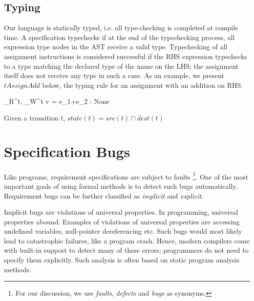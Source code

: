 \documentclass[12pt,a4paper]{article}
\begin{document}
\subsection{Typing}
Our language is statically typed, i.e. all type-checking is completed at compile time. A specification typechecks if at the end of the typechecking process, all expression type nodes in the AST receive a valid type. Typechecking of all assignment instructions is considered successful if the RHS expression typechecks to a type matching the declared type of the name on the LHS; the assignment itself does not receive any type in such a case. As an example, we present $tAssignAdd$ below, the typing rule for an assignment with an addition on RHS.

\begin{center}
\begin{minipage}{0.3\textwidth}
{\sigma_R^t, \sigma_W^t \vdash v = e_1+e_2 : None}
\end{minipage}
\end{center}

\vspace{1cm}
\begin{myrule} \label{r:tp}
	Given a transition $t$, $state(t) = src(t) \sqcap dest(t)$ 
\end{myrule}


\section{Specification Bugs} \label{s:sb}
Like programs, requirement specifications are subject to faults \footnote{For our discussion, we use \emph{faults}, \emph{defects} and \emph{bugs} as synonyms.}. One of the most important goals of using formal methods is to detect such bugs automatically. Requirement bugs can be further classified as \emph{implicit} and \emph{explicit}.

Implicit bugs are violations of universal properties. In programming, universal properties abound. Examples of violations of universal properties are accessing undefined variables, null-pointer dereferencing etc. Such bugs would most likely lead to catastrophic failures, like a program crash. Hence, modern compilers come with built-in support to detect many of these errors; programmers do not need to specify them explicitly. Such analysis is often based on static program analysis methods.
\end{document}
